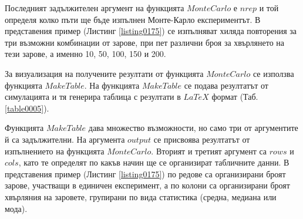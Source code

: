 Последният задължителен аргумент на функцията $MonteCarlo$ е $nrep$ и той определя колко пъти ще бъде изпълнен Монте-Карло експериментът. В представения пример (Листинг \ref{listing0175}) се изпълняват хиляда повторения за три възможни комбинации от зарове, при пет различни броя за хвърлянето на тези зарове, а именно 10, 50, 100, 150 и 200. 

\begin{table}[h]
\centering
{}
\caption{Сравнение на средна, медиана и мода за експеримент със зарове}
\label{table0005}
\end{table}

За визуализация на получените резултати от функцията $MonteCarlo$ се използва функцията $MakeTable$. На функцията $MakeTable$ се подава резултатът от симулацията и тя генерира таблица с резултати в $LaTeX$ формат (Таб. \ref{table0005}).

Функцията $MakeTable$ дава множество възможности, но само три от аргументите й са задължителни. На аргумента $output$ се присвоява резултатът от изпълнението на функцията $MonteCarlo$. Вторият и третият аргумент са $rows$ и $cols$, като те определят по какъв начин ще се организират табличните данни. В представения пример (Листинг \ref{listing0175}) по редове са организирани броят зарове, участващи в единичен експеримент, а по колони са организирани броят хвърляния на заровете, групирани по вида статистика (средна, медиана или мода). 

